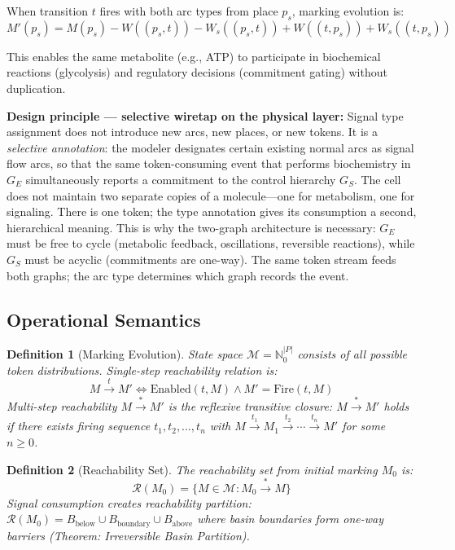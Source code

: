 \documentclass[10pt,letterpaper]{article}
\newtheorem{definition}{Definition}
\begin{document}
When transition $t$ fires with both arc types from place $p_s$, marking evolution is:
\begin{equation}
M'(p_s) = M(p_s) - W((p_s,t)) - W_s((p_s,t)) + W((t,p_s)) + W_s((t,p_s))
\end{equation}

This enables the same metabolite (e.g., ATP) to participate in biochemical reactions (glycolysis) and regulatory decisions (commitment gating) without duplication.

\textbf{Design principle --- selective wiretap on the physical layer:} Signal type assignment does not introduce new arcs, new places, or new tokens. It is a \textit{selective annotation}: the modeler designates certain existing normal arcs as signal flow arcs, so that the same token-consuming event that performs biochemistry in $G_E$ simultaneously reports a commitment to the control hierarchy $G_S$. The cell does not maintain two separate copies of a molecule---one for metabolism, one for signaling. There is one token; the type annotation gives its consumption a second, hierarchical meaning. This is why the two-graph architecture is necessary: $G_E$ must be free to cycle (metabolic feedback, oscillations, reversible reactions), while $G_S$ must be acyclic (commitments are one-way). The same token stream feeds both graphs; the arc type determines which graph records the event.

\subsection{Operational Semantics}

\begin{definition}[Marking Evolution]
State space $\mathcal{M} = \mathbb{N}_0^{|P|}$ consists of all possible token distributions. Single-step reachability relation is:
\begin{equation}
M \xrightarrow{t} M' \iff \text{Enabled}(t, M) \wedge M' = \text{Fire}(t, M)
\end{equation}
Multi-step reachability $M \xrightarrow{*} M'$ is the reflexive transitive closure: $M \xrightarrow{*} M'$ holds if there exists firing sequence $t_1, t_2, \ldots, t_n$ with $M \xrightarrow{t_1} M_1 \xrightarrow{t_2} \cdots \xrightarrow{t_n} M'$ for some $n \geq 0$.
\end{definition}

\begin{definition}[Reachability Set]
The reachability set from initial marking $M_0$ is:
\begin{equation}
\mathcal{R}(M_0) = \{M \in \mathcal{M} : M_0 \xrightarrow{*} M\}
\end{equation}
Signal consumption creates reachability partition: $\mathcal{R}(M_0) = B_{\text{below}} \cup B_{\text{boundary}} \cup B_{\text{above}}$ where basin boundaries form one-way barriers (Theorem: Irreversible Basin Partition).
\end{definition}
\end{document}
